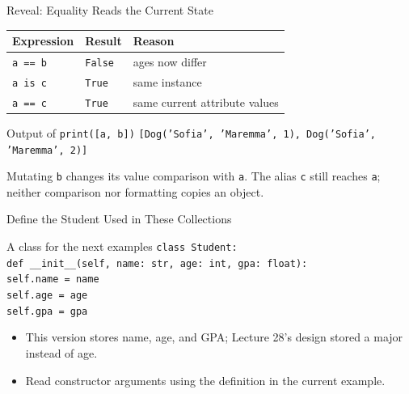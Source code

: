 \documentclass[aspectratio=169,10pt]{beamer}
\begin{document}
\begin{frame}{Reveal: Equality Reads the Current State}
  \begin{center}
    \renewcommand{\arraystretch}{1.35}
    \begin{tabular}{l|l|l}
      \textbf{Expression} & \textbf{Result} & \textbf{Reason} \\\hline
      \texttt{a == b} & \texttt{False} & ages now differ \\
      \texttt{a is c} & \texttt{True} & same instance \\
      \texttt{a == c} & \texttt{True} & same current attribute values
    \end{tabular}
  \end{center}
  \begin{block}{Output of \texttt{print([a, b])}}
    \texttt{[Dog('Sofia', 'Maremma', 1), Dog('Sofia', 'Maremma', 2)]}
  \end{block}
  \begin{keyidea}
    Mutating \texttt{b} changes its value comparison with \texttt{a}. The alias \texttt{c} still reaches \texttt{a}; neither comparison nor formatting copies an object.
  \end{keyidea}
\end{frame}


\begin{frame}{Define the Student Used in These Collections}
  \begin{block}{A class for the next examples}
    \texttt{class Student:}\\
    \hspace*{0.20in}\texttt{def \_\_init\_\_(self, name: str, age: int, gpa: float):}\\
    \hspace*{0.40in}\texttt{self.name = name}\\
    \hspace*{0.40in}\texttt{self.age = age}\\
    \hspace*{0.40in}\texttt{self.gpa = gpa}
  \end{block}
  \begin{itemize}
    \item This version stores name, age, and GPA; Lecture 28's design stored a major instead of age.
    \item Read constructor arguments using the definition in the current example.
  \end{itemize}
\end{frame}
\end{document}
